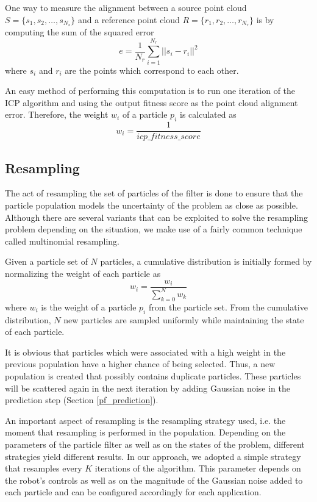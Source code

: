 One way to measure the alignment between a source point cloud
$S = \{s_1, s_2, \dots, s_{N_s}\}$ and a reference point cloud
$R = \{r_1, r_2, \dots, r_{N_r}\}$ is by computing the sum of the
squared error
\begin{equation}
    e = \frac{1}{N_r} \sum_{i=1}^{N_r} || s_i - r_i ||^2
\end{equation}
where $s_i$ and $r_i$ are the points which correspond to each other.

An easy method of performing this computation is to run one iteration of
the ICP algorithm and using the output fitness score as the point cloud
alignment error.
Therefore, the weight $w_i$ of a particle $p_i$ is calculated as
\begin{equation}
    w_i = \frac{1}{icp\_fitness\_score}
\end{equation}

\subsection{Resampling}

The act of resampling the set of particles of the filter is done
to ensure that the particle population models the
uncertainty of the problem as close as possible.
Although there are several variants that can be exploited to solve the
resampling problem depending on the situation, we make use of a fairly
common technique called multinomial resampling.

Given a particle set of $N$ particles, a cumulative distribution is
initially formed by normalizing the weight of each particle as
\begin{equation}
    w_i = \frac{w_i}{\sum\limits_{k=0}^N w_k}
\end{equation}
where $w_i$ is the weight of a particle $p_i$ from the particle set.
From the cumulative distribution, $N$ new particles are sampled
uniformly while maintaining the state of each particle.

It is obvious that particles which were associated with a high
weight in the previous population have a higher chance of being selected.
Thus, a new population is created that possibly contains duplicate
particles.
These particles will be scattered again in the next iteration by
adding Gaussian noise in the prediction step (Section \ref{pf_prediction}).

An important aspect of resampling is the resampling strategy used,
i.e. the moment that resampling is performed in the population.
Depending on the parameters of the particle filter as well as on the
states of the problem, different strategies yield different results.
In our approach, we adopted a simple strategy that resamples every
$K$ iterations of the algorithm.
This parameter depends on the robot's controls as well as on the magnitude of
the Gaussian noise added to each particle and can be configured
accordingly for each application.

